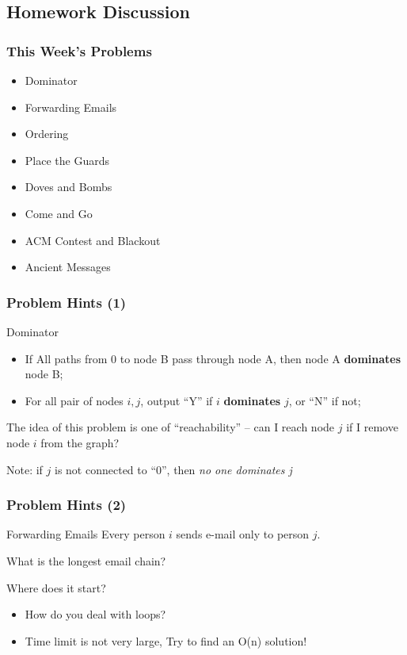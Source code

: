 \subsection{Homework Discussion}

\begin{frame}
  \frametitle{This Week's Problems}
  \begin{itemize}
  \item Dominator
  \item Forwarding Emails
  \item Ordering
  \item Place the Guards
  \item Doves and Bombs
  \item Come and Go
  \item ACM Contest and Blackout
  \item Ancient Messages
  \end{itemize}
\end{frame}

\begin{frame}
  \frametitle{Problem Hints (1)}
  {\smaller
    \begin{block}{Dominator}
      \begin{itemize}
        \item If All paths from 0 to node B pass through node A, then node A {\bf dominates} node B;
        \item For all pair of nodes $i,j$, output ``Y'' if $i$ {\bf dominates} $j$, or ``N'' if not;
      \end{itemize}
    \end{block}

    \bigskip

    The idea of this problem is one of ``reachability'' -- can I reach
    node $j$ if I remove node $i$ from the graph?

    \bigskip

    Note: if $j$ is not connected to ``0'', then \emph{no one dominates j}
  }
\end{frame}

\begin{frame}
  \frametitle{Problem Hints (2)}
  {\smaller
    \begin{block}{Forwarding Emails}
      Every person $i$ sends e-mail only to person $j$.

      \bigskip

      What is the longest email chain?

      \bigskip

      Where does it start?
    \end{block}

    \begin{itemize}
    \item How do you deal with loops?
    \item Time limit is not very large, Try to find an O(n) solution!
    \end{itemize}
  }
\end{frame}

